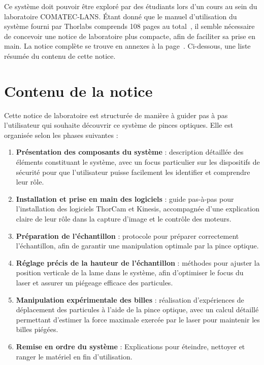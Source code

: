 Ce système doit pouvoir être exploré par des étudiants lors d'un cours au sein du laboratoire COMATEC-LANS. Étant donné que le manuel d'utilisation du système fourni par Thorlabs comprends 108 pages au total~\cite{manualPortableOpticalTweezers}, il semble nécessaire de concevoir une notice de laboratoire plus compacte, afin de faciliter sa prise en main. La notice complète se trouve en annexes à la page~\pageref{annexe:notice_labo}. Ci-dessous, une liste résumée du contenu de cette notice.
\section{Contenu de la notice}
Cette notice de laboratoire est structurée de manière à guider pas à pas l'utilisateur qui souhaite découvrir ce système de pinces optiques. Elle est organisée selon les phases suivantes :

\begin{enumerate}
    \item \textbf{Présentation des composants du système} : description détaillée des éléments constituant le système, avec un focus particulier sur les dispositifs de sécurité pour que l'utilisateur puisse facilement les identifier et comprendre leur rôle.

    \item \textbf{Installation et prise en main des logiciels} : guide pas-à-pas pour l'installation des logiciels ThorCam et Kinesis, accompagnée d'une explication claire de leur rôle dans la capture d'image et le contrôle des moteurs.

    \item \textbf{Préparation de l'échantillon} : protocole pour préparer correctement l'échantillon, afin de garantir une manipulation optimale par la pince optique.

    \item \textbf{Réglage précis de la hauteur de l'échantillon} : méthodes pour ajuster la position verticale de la lame dans le système, afin d'optimiser le focus du laser et assurer un piégeage efficace des particules.

    \item \textbf{Manipulation expérimentale des billes} : réalisation d'expériences de déplacement des particules à l'aide de la pince optique, avec un calcul détaillé permettant d'estimer la force maximale exercée par le laser pour maintenir les billes piégées.

    \item \textbf{Remise en ordre du système} : Explications pour éteindre, nettoyer et ranger le matériel en fin d'utilisation.
\end{enumerate}